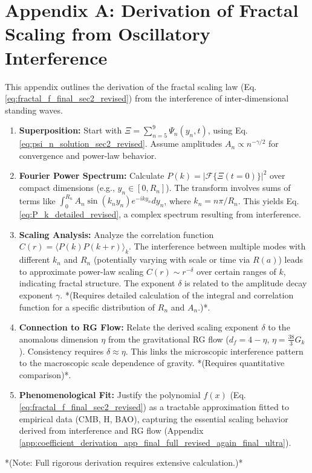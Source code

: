 \documentclass[12pt, a4paper]{article} %
\begin{document}
\section{Appendix A: Derivation of Fractal Scaling from Oscillatory Interference}
\label{app:fractal_derivation}
This appendix outlines the derivation of the fractal scaling law (Eq. \ref{eq:fractal_f_final_sec2_revised}) from the interference of inter-dimensional standing waves.
\begin{enumerate}
    \item \textbf{Superposition:} Start with \( \Xi = \sum_{n=5}^9 \Psi_n(y_n, t) \), using Eq. \eqref{eq:psi_n_solution_sec2_revised}. Assume amplitudes \(A_n \propto n^{-\gamma/2}\) for convergence and power-law behavior.
    \item \textbf{Fourier Power Spectrum:} Calculate \( P(k) = |\mathcal{F}\{\Xi(t=0)\}|^2 \) over compact dimensions (e.g., \(y_n \in [0, R_n]\)). The transform involves sums of terms like \( \int_0^{R_n} A_n \sin(k_n y_n) e^{-i k y_n} dy_n \), where \(k_n = n\pi/R_n\). This yields Eq. \eqref{eq:P_k_detailed_revised}, a complex spectrum resulting from interference.
    \item \textbf{Scaling Analysis:} Analyze the correlation function \( C(r) = \langle P(k) P(k+r) \rangle_k \). The interference between multiple modes with different \(k_n\) and \(R_n\) (potentially varying with scale or time via \(R(a)\)) leads to approximate power-law scaling \( C(r) \sim r^{-\delta} \) over certain ranges of \(k\), indicating fractal structure. The exponent \( \delta \) is related to the amplitude decay exponent \( \gamma \). *(Requires detailed calculation of the integral and correlation function for a specific distribution of \(R_n\) and \(A_n\).)*.
    \item \textbf{Connection to RG Flow:} Relate the derived scaling exponent \( \delta \) to the anomalous dimension \( \eta \) from the gravitational RG flow (\(d_f = 4 - \eta\), \( \eta = \frac{38}{3}G_k \)). Consistency requires \( \delta \approx \eta \). This links the microscopic interference pattern to the macroscopic scale dependence of gravity. *(Requires quantitative comparison)*.
    \item \textbf{Phenomenological Fit:} Justify the polynomial \(f(x)\) (Eq. \ref{eq:fractal_f_final_sec2_revised}) as a tractable approximation fitted to empirical data (CMB, H, BAO), capturing the essential scaling behavior derived from interference and RG flow (Appendix \ref{app:coefficient_derivation_app_final_full_revised_again_final_ultra}).
\end{enumerate}
*(Note: Full rigorous derivation requires extensive calculation.)*
\end{document}
